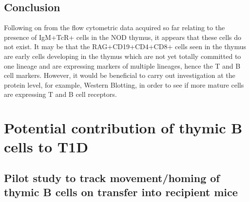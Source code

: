 


\subsection{Conclusion}
Following on from the flow cytometric data acquired so far relating to the presence of IgM+TcR+ cells in the NOD thymus, it appears that these cells do not exist. 
It may be that the RAG+CD19+CD4+CD8+ cells seen in the thymus are early cells developing in the thymus which are not yet totally committed to one lineage and are expressing markers of multiple lineages, hence the T and B cell markers.
However, it would be beneficial to carry out investigation at the protein level, for example, Western Blotting, in order to see if more mature cells are expressing T and B cell receptors.




\section{Potential contribution of thymic B cells to T1D}

\subsection{Pilot study to track movement/homing of thymic B cells on transfer into recipient mice}



